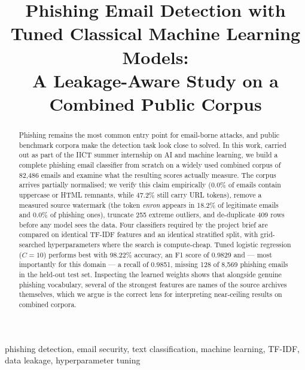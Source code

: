 \documentclass[conference]{IEEEtran}
\begin{document}
\title{Phishing Email Detection with Tuned Classical Machine Learning Models:\\A Leakage-Aware Study on a Combined Public Corpus}

\author{
}

\maketitle

\begin{abstract}
Phishing remains the most common entry point for email-borne attacks, and
public benchmark corpora make the detection task look close to solved. In
this work, carried out as part of the IICT summer internship on AI and
machine learning, we build a complete phishing email classifier from
scratch on a widely used combined corpus of 82{,}486 emails and examine
what the resulting scores actually measure. The corpus arrives partially
normalised; we verify this claim empirically (0.0\% of emails contain
uppercase or HTML remnants, while 47.2\% still carry URL tokens), remove
a measured source watermark (the token \textit{enron} appears in 18.2\%
of legitimate emails and 0.0\% of phishing ones), truncate 255 extreme
outliers, and de-duplicate 409 rows before any model sees the data. Four
classifiers required by the project brief are compared on identical
TF-IDF features and an identical stratified split, with grid-searched
hyperparameters where the search is compute-cheap. Tuned logistic
regression ($C=10$) performs best with 98.22\% accuracy, an F1 score of
0.9829 and --- most importantly for this domain --- a recall of 0.9851,
missing 128 of 8{,}569 phishing emails in the held-out test set.
Inspecting the learned weights shows that alongside genuine phishing
vocabulary, several of the strongest features are names of the source
archives themselves, which we argue is the correct lens for interpreting
near-ceiling results on combined corpora.
\end{abstract}

\begin{IEEEkeywords}
phishing detection, email security, text classification, machine
learning, TF-IDF, data leakage, hyperparameter tuning
\end{IEEEkeywords}
\end{document}
